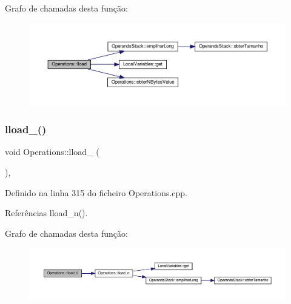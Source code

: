 Grafo de chamadas desta função\+:
\nopagebreak
\begin{figure}[H]
\begin{center}
\leavevmode
\includegraphics[width=350pt]{classOperations_abd9d44b782cc5ae7d7985a424a0985c6_cgraph}
\end{center}
\end{figure}
\mbox{\label{classOperations_a556b64c0764f7a654a30540eb355aab3}} 
\subsubsection{\texorpdfstring{lload\+\_()}{lload\_0()}}
{\footnotesize\ttfamily void Operations\+::lload\+\_ (\begin{DoxyParamCaption}{ }\end{DoxyParamCaption})\hspace{0.3cm}{\ttfamily [static]}, {\ttfamily [private]}}



Definido na linha 315 do ficheiro Operations.\+cpp.



Referências lload\+\_\+n().

Grafo de chamadas desta função\+:
\nopagebreak
\begin{figure}[H]
\begin{center}
\leavevmode
\includegraphics[width=350pt]{classOperations_a556b64c0764f7a654a30540eb355aab3_cgraph}
\end{center}
\end{figure}
\mbox{\label{classOperations_a34e91f6520ca574abce6b2b30ce91948}} 

